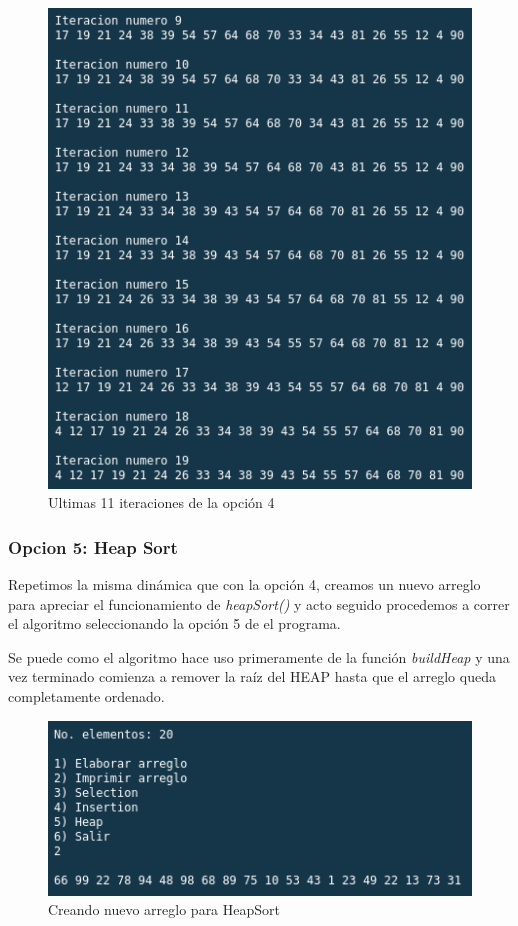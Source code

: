 \documentclass{article}
\begin{document}
			\begin{figure}[H]
				\centering
				\includegraphics[scale = 0.8]{images/e2-4-3}
				\caption{Ultimas 11 iteraciones de la opción 4}
			\end{figure}
			\newpage
		
			\subsubsection{Opcion 5: Heap Sort}
			
			Repetimos la misma dinámica que con la opción 4, creamos un nuevo arreglo para apreciar el funcionamiento de \emph{heapSort()} y acto seguido procedemos a correr el algoritmo seleccionando la opción 5 de el programa.
			
			Se puede como el algoritmo hace uso primeramente de la función \emph{buildHeap} y una vez terminado comienza a remover la raíz del HEAP hasta que el arreglo queda completamente ordenado.
			
			\begin{figure}[H]
				\centering
				\includegraphics[scale = 0.8]{images/e2-5-1}
				\caption{Creando nuevo arreglo para HeapSort}
			\end{figure}
			
\end{document}
